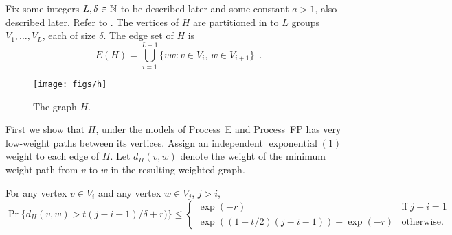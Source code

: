 \documentclass[lotsofwhite]{patmorin}
\DeclareMathOperator{\exponential}{exponential}
\begin{document}
Fix some integers $L,\delta\in\mathbb{N}$ to be described later and some
constant $a>1$, also described later.  Refer to
.  The vertices of $H$ are partitioned in to $L$ groups
$V_1,\ldots,V_L$, each of size $\delta$. The edge set of $H$ is
\[
   E(H) = \bigcup_{i=1}^{L-1} \{vw : v\in V_{i},\, w\in V_{i+1}\} \enspace .
\]
\begin{figure}
  \begin{center}
    \texttt{[image: figs/h]} 
  \end{center}
  \caption{The graph $H$.}
\end{figure}

First we show that $H$, under the models of Process~E and Process~FP
has very low-weight paths between its vertices.
Assign an independent $\exponential(1)$ weight to each edge of $H$.
Let $d_H(v,w)$ denote the weight of the minimum weight path from $v$
to $w$ in the resulting weighted graph.

\begin{lem}
   For any vertex $v\in V_i$ and any vertex $w\in V_j$, $j>i$,
   \[
       \Pr\{d_H(v,w) > t(j-i-1)/\delta + r) \} \le
       \begin{cases}
           \exp(-r) & \text{if $j-i=1$} \\
           \exp((1-t/2)(j-i-1)) + \exp(-r) & \text{otherwise.}
       \end{cases}
   \]
\end{lem}
\end{document}
